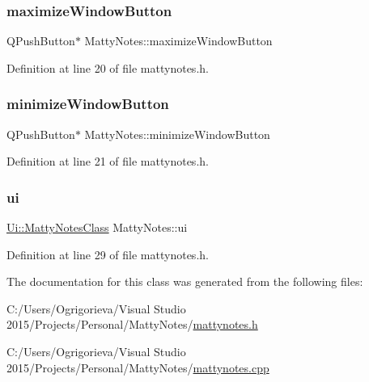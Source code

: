 \subsubsection{\texorpdfstring{maximize\+Window\+Button}{maximizeWindowButton}}
{\footnotesize\ttfamily Q\+Push\+Button$\ast$ Matty\+Notes\+::maximize\+Window\+Button}



Definition at line 20 of file mattynotes.\+h.

\hypertarget{classMattyNotes_a7d7fc5932df5ad6d5cee0fffe2a2feef}{}\label{classMattyNotes_a7d7fc5932df5ad6d5cee0fffe2a2feef} 
\subsubsection{\texorpdfstring{minimize\+Window\+Button}{minimizeWindowButton}}
{\footnotesize\ttfamily Q\+Push\+Button$\ast$ Matty\+Notes\+::minimize\+Window\+Button}



Definition at line 21 of file mattynotes.\+h.

\hypertarget{classMattyNotes_aa697392317715f04e4bc011090bebdb5}{}\label{classMattyNotes_aa697392317715f04e4bc011090bebdb5} 
\subsubsection{\texorpdfstring{ui}{ui}}
{\footnotesize\ttfamily \hyperlink{classUi_1_1MattyNotesClass}{Ui\+::\+Matty\+Notes\+Class} Matty\+Notes\+::ui\hspace{0.3cm}{\ttfamily [private]}}



Definition at line 29 of file mattynotes.\+h.



The documentation for this class was generated from the following files\+:\begin{DoxyCompactItemize}
\item 
C\+:/\+Users/\+Ogrigorieva/\+Visual Studio 2015/\+Projects/\+Personal/\+Matty\+Notes/\hyperlink{mattynotes_8h}{mattynotes.\+h}\item 
C\+:/\+Users/\+Ogrigorieva/\+Visual Studio 2015/\+Projects/\+Personal/\+Matty\+Notes/\hyperlink{mattynotes_8cpp}{mattynotes.\+cpp}\end{DoxyCompactItemize}
